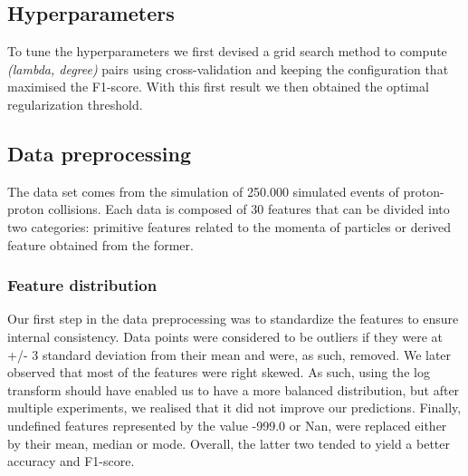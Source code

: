 \documentclass[10pt,conference,compsocconf]{IEEEtran}
\begin{document}
\subsection{Hyperparameters}
To tune the hyperparameters we first devised a grid search method to compute \textit{(lambda, degree)} pairs using cross-validation and keeping the 
configuration that maximised the F1-score. With this first result we then obtained
the optimal regularization threshold.


\subsection{Data preprocessing}
The data set comes from the simulation of 250.000 simulated events 
of proton-proton collisions. Each data is composed of 30 features 
that can be divided into two categories: primitive features related 
to the momenta of particles or derived feature obtained from the former.

\subsubsection{Feature distribution}
Our first step in the data preprocessing was to standardize the features 
to ensure internal consistency. Data points were considered to be 
outliers if they were at +/- 3 standard deviation from their mean and 
were, as such, removed. We later observed that most of the features 
were right skewed. As such, using the log transform should have enabled 
us to have a more balanced distribution, but after multiple experiments, 
we realised that it did not improve our predictions. 
Finally, undefined features represented by the value -999.0 or Nan, 
were replaced either by their mean, median or mode. Overall, the 
latter two tended to yield a better accuracy and F1-score.
\end{document}
